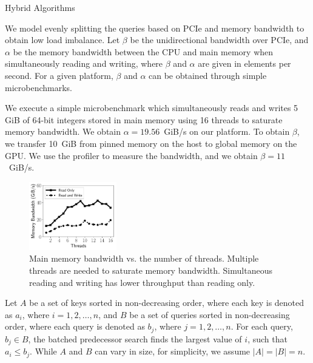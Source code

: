 \documentclass[final]{beamer}
\newlength{\colwidth}
\begin{document}
\begin{frame}[t]
\begin{columns}[t]
\begin{column}{\colwidth}
\begin{block}{Hybrid Algorithms}
\begin{description}[font=$\bullet$~\normalfont\scshape\color{red!50!black}]
\item We model evenly splitting the queries based on PCIe and memory bandwidth to obtain low load imbalance. Let $\beta$ be the unidirectional bandwidth over PCIe, and $\alpha$ be the memory bandwidth between the CPU and main memory when simultaneously reading and writing, where $\beta$ and $\alpha$ are given in elements per second. For a given platform, $\beta$ and  $\alpha$ can be obtained through simple microbenchmarks.

\item We execute a simple microbenchmark which simultaneously reads and writes 5 GiB of 64-bit integers stored in main memory using 16 threads to saturate memory bandwidth. We obtain $\alpha=19.56$~GiB/s on our platform. To obtain $\beta$, we transfer 10~GiB from pinned memory on the host to global memory on the GPU. We use the profiler to measure the bandwidth, and we obtain $\beta=11$~GiB/s. 



\begin{figure}[htp]
\centering
    \includegraphics[width=0.34\textwidth, trim={0.5cm 0.85cm 0.5cm 1cm}]{figures/microbenchmarks_time_vs_threads.pdf}	
    \caption{Main memory bandwidth vs. the number of threads. Multiple threads are needed to saturate memory bandwidth. Simultaneous reading and writing has lower throughput than reading only.}
   \label{fig:mem_bandwidth_scalability}
\end{figure}

\end{description} 

   Let $A$ be a set of keys sorted in non-decreasing order,  
   where each key is denoted as $a_i$, where $i=1, 2,\ldots,n$, and $B$ be a set of queries sorted in non-decreasing order, 
   where each query is denoted as $b_j$, where $j=1, 2,\ldots,n$. For each query, $b_j\in B$, the batched predecessor search 
   finds the largest value of $i$, such that $a_i\leq b_j$. While $A$ and $B$ can vary in size, for simplicity, we assume $|A|=|B|=n$.



\end{block}
\end{column}
\end{columns}
\end{frame}
\end{document}
